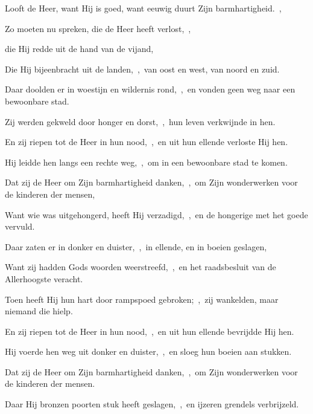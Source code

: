 \documentclass[12pt,twoside,a5paper]{article}
\begin{document}


\begin{halfparskip}
  Looft de Heer, want Hij is goed, want eeuwig duurt Zijn barmhartigheid.~\sep

  Zo moeten nu spreken, die de Heer heeft verlost,~\sep


  die Hij redde uit de hand van de vijand,

  Die Hij bijeenbracht uit de landen,~\sep\ van oost en west, van noord en zuid.
\end{halfparskip}


\begin{halfparskip}
  Daar doolden er in woestijn en wildernis rond,~\sep\ en vonden geen weg naar een bewoonbare stad.

  Zij werden gekweld door honger en dorst,~\sep\ hun leven verkwijnde in hen.

  En zij riepen tot de Heer in hun nood,~\sep\ en uit hun ellende verloste Hij hen.

  Hij leidde hen langs een rechte weg,~\sep\ om in een bewoonbare stad te komen.

  Dat zij de Heer om Zijn barmhartigheid danken,~\sep\ om Zijn wonderwerken voor de kinderen der mensen,

  Want wie was uitgehongerd, heeft Hij verzadigd,~\sep\ en de hongerige met het goede vervuld.
\end{halfparskip}


\begin{halfparskip}
  Daar zaten er in donker en duister,~\sep\ in ellende, en in boeien geslagen,

  Want zij hadden Gods woorden weerstreefd,~\sep\ en het raadsbesluit van de Allerhoogste veracht.

  Toen heeft Hij hun hart door rampspoed gebroken;~\sep\ zij wankelden, maar niemand die hielp.

  En zij riepen tot de Heer in hun nood,~\sep\ en uit hun ellende bevrijdde Hij hen.

  Hij voerde hen weg uit donker en duister,~\sep\ en sloeg hun boeien aan stukken.

  Dat zij de Heer om Zijn barmhartigheid danken,~\sep\ om Zijn wonderwerken voor de kinderen der mensen.

  Daar Hij bronzen poorten stuk heeft geslagen,~\sep\ en ijzeren grendels verbrijzeld.
\end{halfparskip}
\end{document}
